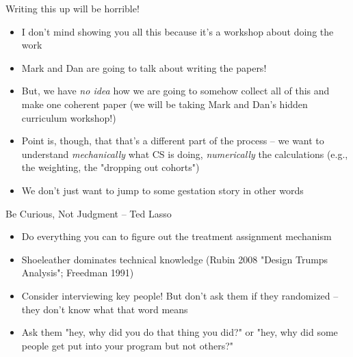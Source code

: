 \documentclass{beamer}
\begin{document}
\begin{frame}{Writing this up will be horrible!}

\begin{itemize}

\item I don't mind showing you all this because it's a workshop about doing the work
\item Mark and Dan are going to talk about writing the papers!
\item But, we have \emph{no idea} how we are going to somehow collect all of this and make one coherent paper (we will be taking Mark and Dan's hidden curriculum workshop!)
\item Point is, though, that that's a different part of the process -- we want to understand \emph{mechanically} what CS is doing, \emph{numerically} the calculations (e.g., the weighting, the "dropping out cohorts")
\item We don't just want to jump to some gestation story in other words
\end{itemize}

\end{frame}



\begin{frame}{Be Curious, Not Judgment -- Ted Lasso}

\begin{itemize}

\item Do everything you can to figure out the treatment assignment mechanism 
\item Shoeleather dominates technical knowledge (Rubin 2008 "Design Trumps Analysis"; Freedman 1991)
\item Consider interviewing key people!  But don't ask them if they randomized -- they don't know what that word means
\item Ask them "hey, why did you do that thing you did?" or "hey, why did some people get put into your program but not others?"
\end{itemize}

\end{frame}
\end{document}
